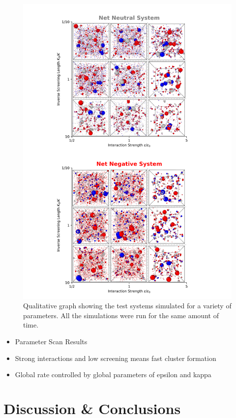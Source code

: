 \documentclass{article}
\begin{document}
\begin{figure}[!htbp]
\centering
\includegraphics[width=0.7\linewidth]{files/Fig9-b4858396f6517661b798f42ca198a015.png}
\caption[]{Qualitative graph showing the test systems simulated for a variety of parameters. All the simulations were run for the same amount of time.}
\label{Fig9ParamScan}
\end{figure}

\begin{itemize}
\item Parameter Scan Results
\end{itemize}

\begin{itemize}
\item Strong interactions and low screening means fast cluster formation
\item Global rate controlled by global parameters of epsilon and kappa
\end{itemize}

\section{Discussion \& Conclusions}
\end{document}
